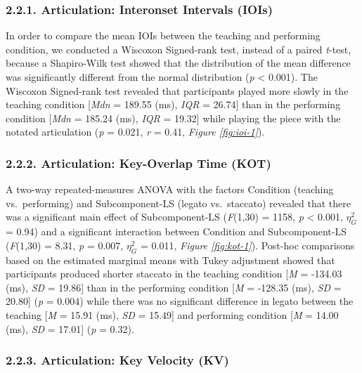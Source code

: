 \documentclass[
  english,
  man,floatsintext]{apa6}
\begin{document}
\hypertarget{articulation-interonset-intervals-iois}{%
\subsubsection{2.2.1. Articulation: Interonset Intervals (IOIs)}\label{articulation-interonset-intervals-iois}}

In order to compare the mean IOIs between the teaching and performing condition, we conducted a Wiscoxon Signed-rank test, instead of a paired \emph{t}-test, because a Shapiro-Wilk test showed that the distribution of the mean difference was significantly different from the normal distribution (\emph{p} \textless{} 0.001). The Wiscoxon Signed-rank test revealed that participants played more slowly in the teaching condition {[}\emph{Mdn} = 189.55 (ms), \emph{IQR} = 26.74{]} than in the performing condition {[}\emph{Mdn} = 185.24 (ms), \emph{IQR} = 19.32{]} while playing the piece with the notated articulation (\emph{p} = 0.021, \emph{r} = 0.41, \emph{Figure \ref{fig:ioi-1}}).

\hypertarget{articulation-key-overlap-time-kot}{%
\subsubsection{2.2.2. Articulation: Key-Overlap Time (KOT)}\label{articulation-key-overlap-time-kot}}

A two-way repeated-measures ANOVA with the factors Condition (teaching vs.~performing) and Subcomponent-LS (legato vs.~staccato) revealed that there was a significant main effect of Subcomponent-LS (\emph{F}(1,30) = 1158, \emph{p} \textless{} 0.001, \(\eta_G^2\) = 0.94) and a significant interaction between Condition and Subcomponent-LS (\emph{F}(1,30) = 8.31, \emph{p} = 0.007, \(\eta_G^2\) = 0.011, \emph{Figure \ref{fig:kot-1}}). Post-hoc comparisons based on the estimated marginal means with Tukey adjustment showed that participants produced shorter staccato in the teaching condition {[}\emph{M} = -134.03 (ms), \emph{SD} = 19.86{]} than in the performing condition {[}\emph{M} = -128.35 (ms), \emph{SD} = 20.80{]} (\emph{p} = 0.004) while there was no significant difference in legato between the teaching {[}\emph{M} = 15.91 (ms), \emph{SD} = 15.49{]} and performing condition {[}\emph{M} = 14.00 (ms), \emph{SD} = 17.01{]} (\emph{p} = 0.32).

\hypertarget{articulation-key-velocity-kv}{%
\subsubsection{2.2.3. Articulation: Key Velocity (KV)}\label{articulation-key-velocity-kv}}
\end{document}
